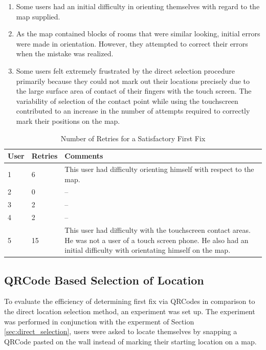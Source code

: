 \begin{enumerate}
\item Some users had an initial difficulty in orienting themselves with regard to 
    the map supplied.
\item As the map contained blocks of rooms that were similar looking,
    initial errors were made in orientation. However, they attempted to 
    correct their errors when the mistake was realized.
\item Some users felt extremely frustrated by the direct selection procedure
    primarily because they could not mark out their locations precisely due
    to the large surface area of contact of their fingers with the touch
    screen. The variability of selection of the contact point while using 
    the touchscreen contributed to an increase in the number of attempts
    required to correctly mark their positions on the map.
\end{enumerate}

\begin{table}
\centering
\begin{tabular}{p{0.8in} p{0.8in} p{3.4in}}
\hline
\hline
User     & Retries & Comments \\
\hline
1               & 6                  & This user had difficulty orienting himself with respect to the map. \\
2               & 0                  & -- \\
3               & 2                  & -- \\
4               & 2                  & -- \\
5               & 15                 & This user had difficulty with the touchscreen contact areas. He was not a user of a touch screen phone. He also had an initial difficulty with orientating himself on the map. \\
\hline
\end{tabular}
\caption{Number of Retries for a Satisfactory First Fix\label{tbl:num_loc_attempts}}
\end{table}

\subsection{QRCode Based Selection of Location\label{sec:qrcode_selection}}

To evaluate the efficiency of determining first fix via QRCodes in comparison 
to the direct location selection method, an experiment was set up. 
The experiment was performed in conjunction with the experment of 
Section \ref{sec:direct_selection}, users were asked to locate themselves
by snapping a QRCode pasted on the wall instead of marking their starting 
location on a map.

